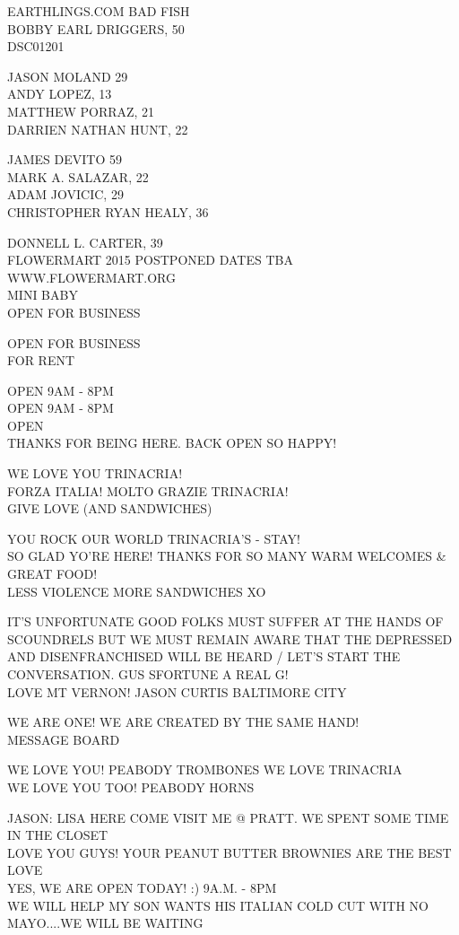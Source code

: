 \documentclass[10pt,letterpaper]{article}
\begin{document}
EARTHLINGS.COM BAD FISH\\
BOBBY EARL DRIGGERS, 50\\
DSC01201

JASON MOLAND 29\\
ANDY LOPEZ, 13\\
MATTHEW PORRAZ, 21\\
DARRIEN NATHAN HUNT, 22

JAMES DEVITO 59\\
MARK A. SALAZAR, 22\\
ADAM JOVICIC, 29\\
CHRISTOPHER RYAN HEALY, 36

DONNELL L. CARTER, 39\\
FLOWERMART 2015 POSTPONED DATES TBA WWW.FLOWERMART.ORG\\
MINI BABY\\
OPEN FOR BUSINESS

OPEN FOR BUSINESS\\
FOR RENT

OPEN 9AM {-} 8PM\\
OPEN 9AM {-} 8PM\\
OPEN\\
THANKS FOR BEING HERE.  BACK OPEN SO HAPPY!

WE LOVE YOU TRINACRIA!\\
FORZA ITALIA!  MOLTO GRAZIE TRINACRIA!\\
GIVE LOVE (AND SANDWICHES)

YOU ROCK OUR WORLD TRINACRIA'S {-} STAY!\\
SO GLAD YO'RE HERE!  THANKS FOR SO MANY WARM WELCOMES \& GREAT FOOD!\\
LESS VIOLENCE MORE SANDWICHES XO

IT'S UNFORTUNATE GOOD FOLKS MUST SUFFER AT THE HANDS OF SCOUNDRELS BUT WE MUST REMAIN AWARE THAT THE DEPRESSED AND DISENFRANCHISED WILL BE HEARD / LET'S START THE CONVERSATION.  GUS SFORTUNE A REAL G!\\
LOVE MT VERNON!  JASON CURTIS BALTIMORE CITY

WE ARE ONE!  WE ARE CREATED BY THE SAME HAND!\\
MESSAGE BOARD

WE LOVE YOU!  PEABODY TROMBONES WE LOVE TRINACRIA\\
WE LOVE YOU TOO!  PEABODY HORNS

JASON: LISA HERE COME VISIT ME @ PRATT.  WE SPENT SOME TIME IN THE CLOSET\\
LOVE YOU GUYS!  YOUR PEANUT BUTTER BROWNIES ARE THE BEST LOVE\\
YES, WE ARE OPEN TODAY! :)  9A.M. {-} 8PM\\
WE WILL HELP MY SON WANTS HIS ITALIAN COLD CUT WITH NO MAYO....WE WILL BE WAITING
\end{document}

